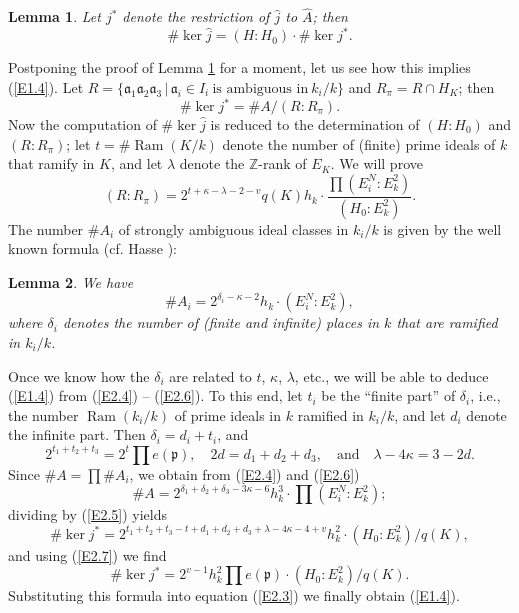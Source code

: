 \documentclass{amsart}
\newcommand{\Z}{\mathbb Z}
\newcommand{\fa}{{\mathfrak a}}
\newcommand{\fp}{{\mathfrak p}}
\newcommand{\hj}{\widehat{j}}
\newcommand{\hA}{\widehat{A}}
\newcommand{\sth}{\,|\,}
\newcommand{\Ram}{{\operatorname{Ram}}}
\newtheorem{lemma}{Lemma}
\begin{document}
\begin{lemma}\label{L2.3}
Let $j^*$ denote the restriction of $\hj$ to $\hA$; then
\begin{equation}\label{E2.3}
 \# \ker \hj = (H:H_0) \cdot \# \ker j^*.
\end{equation}
\end{lemma}

Postponing the proof of Lemma \ref{L2.3} for a moment,
let us see how this implies (\ref{E1.4}). Let
$R = \{\fa_1\fa_2\fa_3 \sth \fa_i \in I_i\ \text{is ambiguous in}\
 k_i/k\}$ and $R_\pi = R \cap H_K$; then
\begin{equation}\label{E2.4}
  \# \ker j^* = \# A / (R:R_\pi).
\end{equation}
Now the computation of $\# \ker \hj$ is reduced to the determination
of $(H:H_0)$ and $(R:R_\pi)$; let $t = \# \Ram(K/k)$ denote the
number of (finite) prime ideals of $k$ that ramify in $K$, and
let $\lambda$ denote the $\Z$-rank of $E_K$. We will prove
\begin{equation}\label{E2.5}
  (R:R_\pi) = 2^{t+\kappa-\lambda-2-v} q(K) h_k \cdot
      \frac{\prod (E_i^N : E_k^2)}{(H_0:E_k^2)}.
\end{equation}
The number $\# A_i$ of strongly ambiguous ideal classes in
$k_i/k$ is given by the well known formula (cf. Hasse
\cite[Teil Ia, \S 13]{HasB}):

\begin{lemma}\label{P2.6}
We have
\begin{equation}\label{E2.6}
  \# A_i = 2^{\delta_i - \kappa - 2} h_k \cdot (E_i^N:E_k^2),
\end{equation}
where $\delta_i$ denotes the number of (finite and infinite) places
in $k$ that are ramified in $k_i/k$.
\end{lemma}

Once we know how the $\delta_i$ are related to $t$, $\kappa$,
$\lambda$, etc., we will be able to deduce (\ref{E1.4}) from
(\ref{E2.4}) -- (\ref{E2.6}). To this end, let $t_i$ be the
``finite part'' of $\delta_i$, i.e., the number
$\Ram(k_i/k)$ of prime ideals in $k$ ramified in $k_i/k$, and
let $d_i$ denote the infinite part. Then $\delta_i = d_i + t_i$,
and
\begin{equation}\label{E2.7}
  2^{t_1+t_2+t_3} = 2^t \prod e(\fp), \quad
  2d = d_1 + d_2 + d_3, \quad \text{and} \quad
  \lambda - 4\kappa = 3-2d.
\end{equation}
Since $\# A = \prod \# A_i$, we obtain from (\ref{E2.4})
and (\ref{E2.6})
$$ \# A = 2^{\delta_1 + \delta_2 + \delta_3 - 3\kappa - 6}
    h_k^3 \cdot \prod (E_i^N : E_k^2); $$
dividing by (\ref{E2.5}) yields
$$ \# \ker j^* = 2^{t_1+t_2+t_3-t+d_1+d_2+d_3 + \lambda
   - 4\kappa - 4 + v} h_k^2 \cdot (H_0 : E_k^2)/q(K), $$
and using (\ref{E2.7}) we find
$$ \# \ker j^* = 2^{v-1} h_k^2 \prod e(\fp) \cdot
   (H_0 : E_k^2)/q(K). $$
Substituting this formula into equation (\ref{E2.3})
we finally obtain (\ref{E1.4}).
\end{document}
